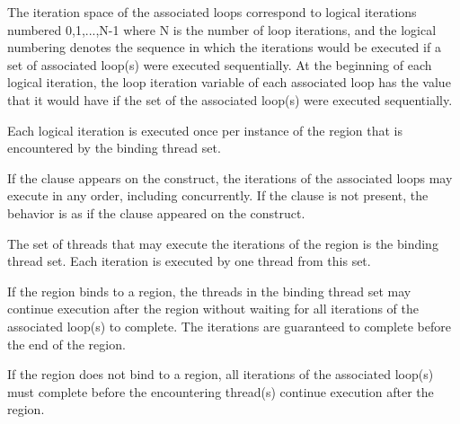 The iteration space of the associated loops correspond to logical
iterations numbered 0,1,...,N-1 where N is the number of loop iterations, and
the logical numbering denotes the sequence in which the iterations would be
executed if a set of associated loop(s) were executed sequentially.  At the
beginning of each logical iteration, the loop iteration variable of each
associated loop has the value that it would have if the set of the associated
loop(s) were executed sequentially. 


Each logical iteration is executed once per instance of the 
region that is encountered by the binding thread set.

If the
 clause appears on the  construct, the
iterations of the associated loops may execute in any order, including
concurrently. If the  clause is not present, the behavior is as if
the  clause appeared on the construct.

The set of threads that may execute the iterations of the  region
is the binding thread set. Each iteration is executed by one thread from this
set.

If the  region binds to a  region, the threads in the
binding thread set may continue execution after the  region without
waiting for all iterations of the associated loop(s) to complete. The
iterations are guaranteed to complete before the end of the 
region. 

If the  region does not bind to a  region, all
iterations of the associated loop(s) must complete before the encountering
thread(s) continue execution after the  region.




